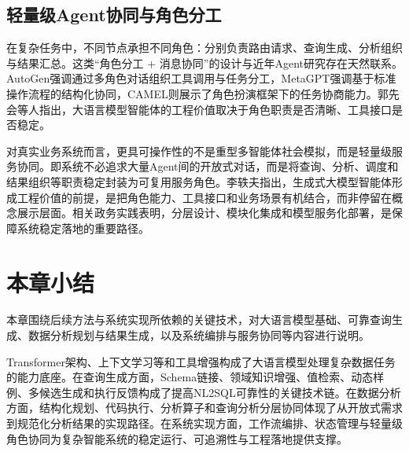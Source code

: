 \subsection{轻量级Agent协同与角色分工}

在复杂任务中，不同节点承担不同角色：分别负责路由请求、查询生成、分析组织与结果汇总。这类“角色分工 + 消息协同”的设计与近年Agent研究存在天然联系。AutoGen\cite{wu2023autogen}强调通过多角色对话组织工具调用与任务分工，MetaGPT\cite{hong2024metagpt}强调基于标准操作流程的结构化协同，CAMEL\cite{li2023camel}则展示了角色扮演框架下的任务协商能力。郭先会等人\cite{郭先会2024}指出，大语言模型智能体的工程价值取决于角色职责是否清晰、工具接口是否稳定。

对真实业务系统而言，更具可操作性的不是重型多智能体社会模拟，而是轻量级服务协同。即系统不必追求大量Agent间的开放式对话，而是将查询、分析、调度和结果组织等职责稳定封装为可复用服务角色。李轶夫\cite{李轶夫2025}指出，生成式大模型智能体形成工程价值的前提，是把角色能力、工具接口和业务场景有机结合，而非停留在概念展示层面。相关政务实践表明，分层设计、模块化集成和模型服务化部署，是保障系统稳定落地的重要路径\cite{王薇2025,吴重庆2025,兰洪浩2025}。

\section{本章小结}

本章围绕后续方法与系统实现所依赖的关键技术，对大语言模型基础、可靠查询生成、数据分析规划与结果生成，以及系统编排与服务协同等内容进行说明。

Transformer架构、上下文学习等和工具增强构成了大语言模型处理复杂数据任务的能力底座。在查询生成方面，Schema链接、领域知识增强、值检索、动态样例、多候选生成和执行反馈构成了提高NL2SQL可靠性的关键技术链。在数据分析方面，结构化规划、代码执行、分析算子和查询分析分层协同体现了从开放式需求到规范化分析结果的实现路径。在系统实现方面，工作流编排、状态管理与轻量级角色协同为复杂智能系统的稳定运行、可追溯性与工程落地提供支撑。
